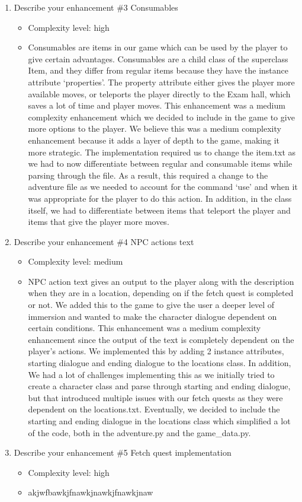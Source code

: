 \documentclass[11pt]{article}
\begin{document}
\begin{enumerate}
\item Describe your enhancement \#3 Consumables
	\begin{itemize}
	\item Complexity level: high
    \item Consumables are items in our game which can be used by the player to give certain advantages. Consumables are a child class of the superclass Item, and they differ from regular items because they have the instance attribute ‘properties’. The property attribute either gives the player more available moves, or teleports the player directly to the Exam hall, which saves a lot of time and player moves. This enhancement was a medium complexity enhancement which we decided to include in the game to give more options to the player. We believe this was a medium complexity enhancement because it adds a layer of depth to the game, making it more strategic. The implementation required us to change the item.txt as we had to now differentiate between regular and consumable items while parsing through the file. As a result, this required a change to the adventure file as we needed to account for the command ‘use’ and when it was appropriate for the player to do this action. In addition, in the class itself, we had to differentiate between items that teleport the player and items that give the player more moves.
	\end{itemize}

\item Describe your enhancement \#4 NPC actions text
        \begin{itemize}
        \item Complexity level: medium
    \item NPC action text gives an output to the player along with the description when they are in a location, depending on if the fetch quest is completed or not. We added this to the game to give the user a deeper level of immersion and wanted to make the character dialogue dependent on certain conditions. This enhancement was a medium complexity enhancement since the output of the text is completely dependent on the player's actions. We implemented this by adding 2 instance attributes, starting dialogue and ending dialogue to the locations class. In addition, We had a lot of challenges implementing this as we initially tried to create a character class and parse through starting and ending dialogue, but that introduced multiple issues with our fetch quests as they were dependent on the locations.txt. Eventually, we decided to include the starting and ending dialogue in the locations class which simplified a lot of the code, both in the adventure.py and the game\_data.py.
	\end{itemize}

\item Describe your enhancement \#5 Fetch quest implementation
	\begin{itemize}
	\item Complexity level: high
    \item akjwfbawkjfnawkjnawkjfnawkjnaw
	\end{itemize}

\end{enumerate}
\end{document}
